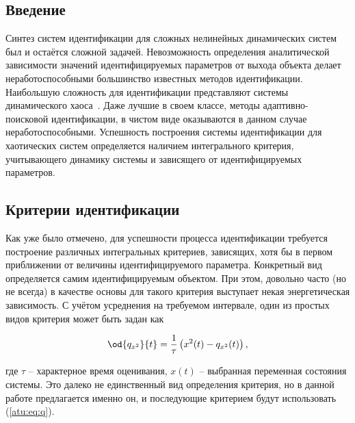 \documentclass[a4paper,paratype,12pt,fouriernc]{cmonogra}
\title{\bookname}
\author{Коллективный автор}
\begin{document}
\tableofcontents



\subsection*{Введение}

Синтез систем идентификации для сложных нелинейных динамических систем
был и остаётся сложной задачей. Невозможность определения
аналитической зависимости значений идентифицируемых параметров
от выхода объекта делает неработоспособными большинство известных
методов идентификации. Наибольшую сложность для идентификации
представляют системы динамического хаоса~\cite{moon_chaotic_vibr,anisch_nonlin_eff,sprott_212}.
Даже лучшие в своем классе, методы адаптивно-поисковой идентификации, %
в чистом виде оказываются в данном случае неработоспособными.
Успешность построения системы идентификации для хаотических
систем определяется наличием интегрального критерия,
учитывающего динамику системы и зависящего от идентифицируемых параметров.


\subsection*{Критерии идентификации}

Как уже было отмечено, для успешности процесса идентификации требуется
построение различных интегральных критериев, зависящих,
хотя бы в первом приближении
от величины идентифицируемого параметра. Конкретный вид определяется самим идентифицируемым
объектом. При этом, довольно часто (но не всегда) в качестве основы для такого критерия выступает
некая энергетическая зависимость. С учётом усреднения на требуемом интервале,
один из простых видов критерия может быть задан как

\begin{equation}
\od{q_{x^2}}{t}
=
\frac{1}{\tau} \left( x^2(t) - q_{x^2}(t) \right)
,
\label{atu:eq:q}
\end{equation}

\noindent
где $\tau$ -- характерное время оценивания, $x(t)$ -- выбранная переменная состояния системы.
Это далеко не единственный вид определения критерия, но в данной работе предлагается именно он,
и последующие критерием будут использовать (\ref{atu:eq:q}).
\end{document}
